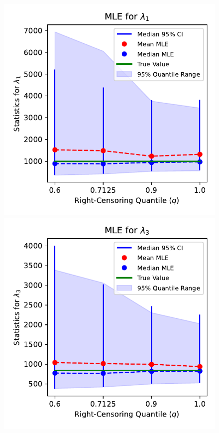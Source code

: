 \documentclass{article} %
\begin{document}
\begin{figure}
    \begin{minipage}{.5\textwidth}
        \includegraphics[width=\linewidth]{../plot-q-vs-scale.1-mle.pdf}
    \end{minipage}%
    \begin{minipage}{.5\textwidth}
        \includegraphics[width=\linewidth]{../plot-q-vs-scale.3-mle.pdf}
    \end{minipage}
\end{figure}
\end{document}
